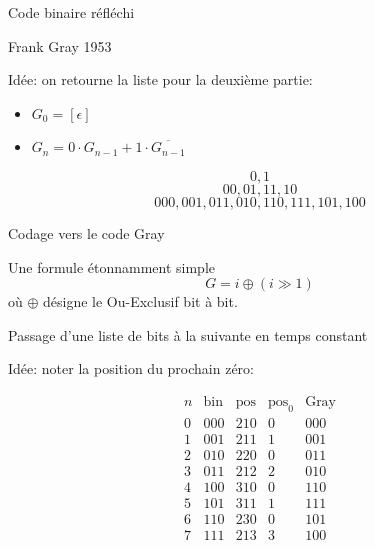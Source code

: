 \documentclass{beamer}
\begin{document}
\begin{frame}{Code binaire réfléchi}

  Frank Gray 1953
  \bigskip

  \begin{DEFN}
    Idée: on retourne la liste pour la deuxième partie:
    \begin{itemize}
    \item $G_0= [\epsilon]$
    \item $G_n= 0\cdot G_{n-1} + 1\cdot \overline{G_{n-1}}$
    \end{itemize}
  \end{DEFN}
  \[0, 1\]
  \[00, 01, 11, 10\]
  \[000, 001, 011, 010, 110, 111, 101, 100\]
\end{frame}

\begin{frame}{Codage vers le code Gray}

  \begin{NOTE}
    Une formule étonnamment simple
    \[G = i \oplus (i \gg 1)\]
    où $\oplus$ désigne le Ou-Exclusif bit à bit. 
  \end{NOTE}
\end{frame}

\begin{frame}{Passage d'une liste de bits à la suivante en temps constant}

Idée: noter la position du prochain zéro:

\[\begin{array}{ccccc}
n & \text{bin} & \text{pos}  &  \text{pos}_0 & \text{Gray} \\\hline
0 & 000 & 210 & 0 & 000\\
1 & 001 & 211 & 1 & 001\\
2 & 010 & 220 & 0 & 011\\
3 & 011 & 212 & 2 & 010\\
4 & 100 & 310 & 0 & 110\\
5 & 101 & 311 & 1 & 111\\
6 & 110 & 230 & 0 & 101\\
7 & 111 & 213 & 3 & 100\\
\end{array}\]
\end{frame}
\end{document}

